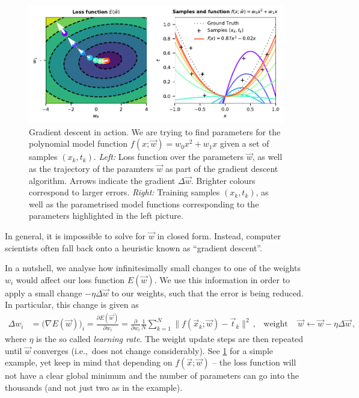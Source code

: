 \documentclass[10pt,letterpaper,oneside]{article}
\begin{document}
\begin{figure}
	\centering
	\includegraphics{media/gradient_descent_poly_example_10.pdf}
	\caption{Gradient descent in action. We are trying to find parameters for the polynomial model function $f(x; \vec w) = w_0 x^2 + w_1 x$ given a set of samples $(x_k, t_k)$. \emph{Left:} Loss function over the parameters $\vec w$, as well as the trajectory of the paramters $\vec w$ as part of the gradient descent algorithm. Arrows indicate the gradient $\Delta \vec w$. Brighter colours correspond to larger errors. \emph{Right:} Training samples $(x_k, t_k)$, as well as the parametrised model functions corresponding to the parameters highlighted in the left picture. }
	\label{fig:gradient_descent_poly_example_10}
\end{figure}

In general, it is impossible to solve for $\vec w$ in closed form. Instead, computer scientists often fall back onto a heuristic known as \enquote{gradient descent}.

In a nutshell, we analyse how infinitesimally small changes to one of the weights $w_i$ would affect our loss function $E(\vec w)$. We use this information in order to apply a small change $- \eta \Delta \vec w$ to our weights, such that the error is being reduced. In particular, this change is given as
\begin{align*}
	\Delta w_i &= \big( \nabla E(\vec w) \big)_i =  \frac{\partial E(\vec w)}{\partial w_i} = \frac{\partial}{\partial w_i} \frac{1}{N} \sum_{k = 1}^N \big\| f(\vec x_k ; \vec w) - \vec t_k \big\|^2 \,, & \text{weight update step } \vec w &\gets \vec w - \eta \Delta \vec w \,,
\end{align*}
where $\eta$ is the so called \emph{learning rate}. The weight update steps are then repeated until $\vec w$ converges (i.e.,~does not change considerably). See \cref{fig:gradient_descent_poly_example_10} for a simple example, yet keep in mind that depending on $f(\vec x; \vec w)$ -- the loss function will not have a clear global minimum and the number of parameters can go into the thousands (and not just two as in the example).
\end{document}
